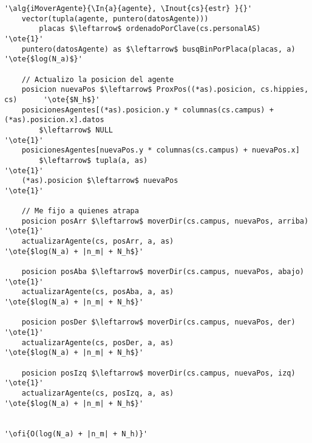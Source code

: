 \begin{lstlisting}[mathescape]
'\alg{iMoverAgente}{\In{a}{agente}, \Inout{cs}{estr} }{}'
	vector(tupla(agente, puntero(datosAgente)))
		placas $\leftarrow$ ordenadoPorClave(cs.personalAS)						'\ote{1}'
	puntero(datosAgente) as $\leftarrow$ busqBinPorPlaca(placas, a)				'\ote{$log(N_a)$}'

	// Actualizo la posicion del agente
	posicion nuevaPos $\leftarrow$ ProxPos((*as).posicion, cs.hippies, cs)		'\ote{$N_h$}'
	posicionesAgentes[(*as).posicion.y * columnas(cs.campus) + (*as).posicion.x].datos
		$\leftarrow$ NULL														'\ote{1}'
	posicionesAgentes[nuevaPos.y * columnas(cs.campus) + nuevaPos.x]
		$\leftarrow$ tupla(a, as)												'\ote{1}'
	(*as).posicion $\leftarrow$ nuevaPos										'\ote{1}'

	// Me fijo a quienes atrapa
	posicion posArr $\leftarrow$ moverDir(cs.campus, nuevaPos, arriba)			'\ote{1}'
	actualizarAgente(cs, posArr, a, as) 				'\ote{$log(N_a) + |n_m| + N_h$}'

	posicion posAba $\leftarrow$ moverDir(cs.campus, nuevaPos, abajo)			'\ote{1}'
	actualizarAgente(cs, posAba, a, as) 				'\ote{$log(N_a) + |n_m| + N_h$}'

	posicion posDer $\leftarrow$ moverDir(cs.campus, nuevaPos, der)				'\ote{1}'
	actualizarAgente(cs, posDer, a, as) 				'\ote{$log(N_a) + |n_m| + N_h$}'

	posicion posIzq $\leftarrow$ moverDir(cs.campus, nuevaPos, izq)				'\ote{1}'
	actualizarAgente(cs, posIzq, a, as) 				'\ote{$log(N_a) + |n_m| + N_h$}'


'\ofi{O(log(N_a) + |n_m| + N_h)}'
\end{lstlisting}

